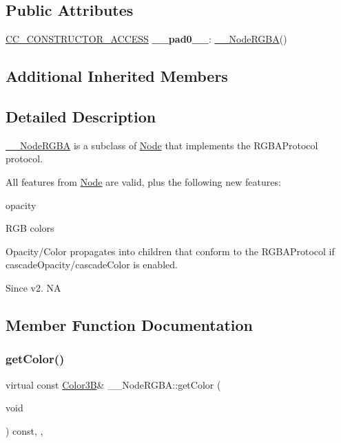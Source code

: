 \subsection*{Public Attributes}
\begin{DoxyCompactItemize}
\item 
\mbox{\label{class____NodeRGBA_a205293d39d3aa89e9cb3c32dc281dffd}} 
\hyperlink{_2cocos2d_2cocos_2base_2ccConfig_8h_a25ef1314f97c35a2ed3d029b0ead6da0}{C\+C\+\_\+\+C\+O\+N\+S\+T\+R\+U\+C\+T\+O\+R\+\_\+\+A\+C\+C\+E\+SS} {\bfseries \+\_\+\+\_\+pad0\+\_\+\+\_\+}\+: \hyperlink{class____NodeRGBA}{\+\_\+\+\_\+\+Node\+R\+G\+BA}()
\end{DoxyCompactItemize}
\subsection*{Additional Inherited Members}


\subsection{Detailed Description}
\hyperlink{class____NodeRGBA}{\+\_\+\+\_\+\+Node\+R\+G\+BA} is a subclass of \hyperlink{classNode}{Node} that implements the R\+G\+B\+A\+Protocol protocol. 

All features from \hyperlink{classNode}{Node} are valid, plus the following new features\+:
\begin{DoxyItemize}
\item opacity
\item R\+GB colors
\end{DoxyItemize}

Opacity/\+Color propagates into children that conform to the R\+G\+B\+A\+Protocol if cascade\+Opacity/cascade\+Color is enabled. \begin{DoxySince}{Since}
v2.  NA 
\end{DoxySince}


\subsection{Member Function Documentation}
\mbox{\label{class____NodeRGBA_a730149ff787a7a86d78a5c0d0aecddda}} 
\subsubsection{\texorpdfstring{get\+Color()}{getColor()}\hspace{0.1cm}{\footnotesize\ttfamily [1/2]}}
{\footnotesize\ttfamily virtual const \hyperlink{structColor3B}{Color3B}\& \+\_\+\+\_\+\+Node\+R\+G\+B\+A\+::get\+Color (\begin{DoxyParamCaption}\item[{void}]{ }\end{DoxyParamCaption}) const\hspace{0.3cm}{\ttfamily [inline]}, {\ttfamily [override]}, {\ttfamily [virtual]}}

